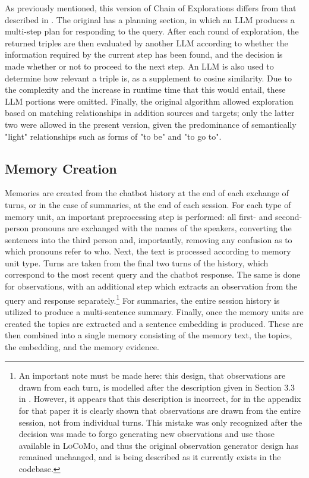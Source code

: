As previously mentioned, this version of Chain of Explorations differs from that described in \cite{Sanmartin2024}. The original has a planning section, in which an LLM produces a multi-step plan for responding to the query. After each round of exploration, the returned triples are then evaluated by another LLM according to whether the information required by the current step has been found, and the decision is made whether or not to proceed to the next step. An LLM is also used to determine how relevant a triple is, as a supplement to cosine similarity. Due to the complexity and the increase in runtime time that this would entail, these LLM portions were omitted. Finally, the original algorithm allowed exploration based on matching relationships in addition sources and targets; only the latter two were allowed in the present version, given the predominance of semantically "light" relationships such as forms of "to be" and "to go to".



\subsection{Memory Creation}

Memories are created from the chatbot history at the end of each exchange of turns, or in the case of summaries, at the end of each session. For each type of memory unit, an important preprocessing step is performed: all first- and second-person pronouns are exchanged with the names of the speakers, converting the sentences into the third person and, importantly, removing any confusion as to which pronouns refer to who. Next, the text is processed according to memory unit type. Turns are taken from the final two turns of the history, which correspond to the most recent query and the chatbot response. The same is done for observations, with an additional step which extracts an observation from the query and response separately.\footnote{An important note must be made here: this design, that observations are drawn from each turn, is modelled after the description given in Section 3.3 in \cite{Maharana2024}. However, it appears that this description is incorrect, for in the appendix for that paper it is clearly shown that observations are drawn from the entire session, not from individual turns. This mistake was only recognized after the decision was made to forgo generating new observations and use those available in \textsc{LoCoMo}, and thus the original observation generator design has remained unchanged, and is being described as it currently exists in the codebase.} For summaries, the entire session history is utilized to produce a multi-sentence summary. Finally, once the memory units are created the topics are extracted and a sentence embedding is produced. These are then combined into a single memory consisting of the memory text, the topics, the embedding, and the memory evidence.


